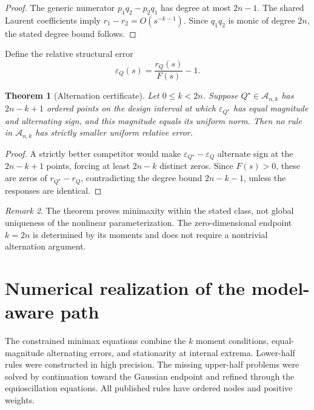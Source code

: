 \documentclass[preprint,12pt]{elsarticle}
\newtheorem{theorem}{Theorem}
\theoremstyle{remark}
\newtheorem{remark}[theorem]{Remark}
\begin{document}
\begin{proof}
The generic numerator \(p_1q_2-p_2q_1\) has degree at most \(2n-1\).
The shared Laurent coefficients imply
\(r_1-r_2=O(s^{-k-1})\). Since \(q_1q_2\) is monic of degree \(2n\),
the stated degree bound follows.
\end{proof}

Define the relative structural error
\[
\varepsilon_Q(s)=\frac{r_Q(s)}{F(s)}-1.
\]

\begin{theorem}[Alternation certificate]
Let \(0\leq k<2n\). Suppose \(Q^\star\in\mathcal A_{n,k}\) has
\(2n-k+1\) ordered points on the design interval at which
\(\varepsilon_{Q^\star}\) has equal magnitude and alternating sign, and
this magnitude equals its uniform norm. Then no rule in
\(\mathcal A_{n,k}\) has strictly smaller uniform relative error.
\end{theorem}

\begin{proof}
A strictly better competitor would make
\(\varepsilon_{Q^\star}-\varepsilon_Q\) alternate sign at the
\(2n-k+1\) points, forcing at least \(2n-k\) distinct zeros. Since
\(F(s)>0\), these are zeros of \(r_{Q^\star}-r_Q\), contradicting the
degree bound \(2n-k-1\), unless the responses are identical.
\end{proof}

\begin{remark}
The theorem proves minimaxity within the stated class, not global
uniqueness of the nonlinear parameterization. The zero-dimensional
endpoint \(k=2n\) is determined by its moments and does not require a
nontrivial alternation argument.
\end{remark}

\section{Numerical realization of the model-aware path}

The constrained minimax equations combine the \(k\) moment conditions,
equal-magnitude alternating errors, and stationarity at internal
extrema. Lower-half rules were constructed in high precision. The
missing upper-half problems were solved by continuation toward the
Gaussian endpoint and refined through the equioscillation equations.
All published rules have ordered nodes and positive weights.
\end{document}
